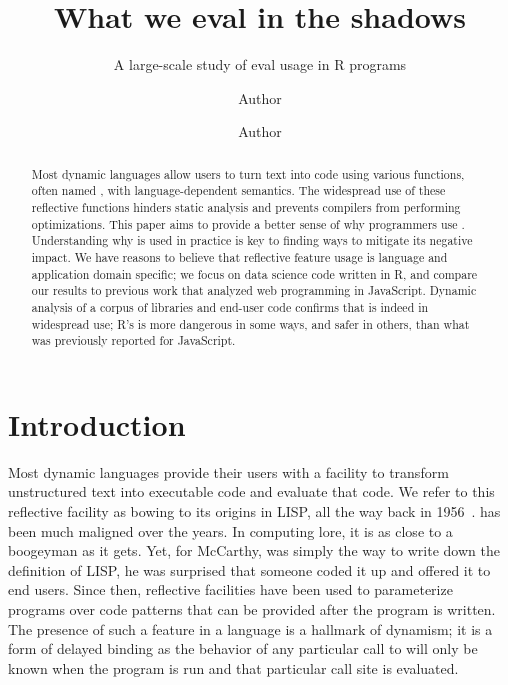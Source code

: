 \documentclass[screen,acmsmall]{acmart}
\begin{document}
\title{What we {\sf eval} in the shadows}
\subtitle{A large-scale study of {\sf eval} usage in R programs}



\author{Author }
\orcid{}
\author{Author}
\authornotemark[1]


\begin{abstract}
  \noindent Most dynamic languages allow users to turn text into code
  using various functions, often named \eval, with language-dependent
  semantics. The widespread use of these reflective functions hinders
  static analysis and prevents compilers from performing
  optimizations. This paper aims to provide a better sense of why
  programmers use \eval. Understanding why \eval is used in practice
  is key to finding ways to mitigate its negative impact. We have
  reasons to believe that reflective feature usage is language and
  application domain specific; we focus on data science code written
  in R, and compare our results to previous work that analyzed web
  programming in JavaScript. Dynamic analysis of a corpus of
  \CranAllPackages libraries and \KaggleCode end-user code confirms that
  \eval is indeed in widespread use; R's \eval is more dangerous in
  some ways, and safer in others, than what was previously reported
  for JavaScript.
\end{abstract}

\maketitle

\section{Introduction}

Most dynamic languages provide their users with a facility to
transform unstructured text into executable code and evaluate that
code. We refer to this reflective facility as \eval bowing to its
origins in LISP, all the way back in 1956~\cite{lisp}. \Eval has been
much maligned over the years. In computing lore, it is as close to a
boogeyman as it gets. Yet, for McCarthy, \eval was simply the way to
write down the definition of LISP, he was surprised that someone coded
it up and offered it to end users. Since then, reflective facilities
have been used to parameterize programs over code patterns that can be
provided after the program is written. The presence of such a feature
in a language is a hallmark of dynamism; it is a form of delayed
binding as the behavior of any particular call to \eval will only be
known when the program is run and that particular call site is
evaluated.
\end{document}
